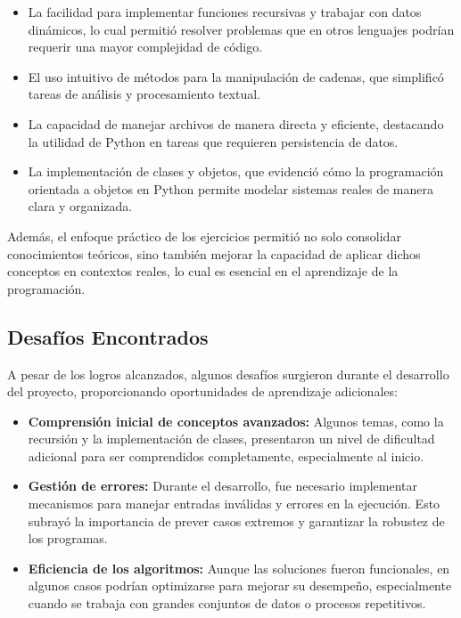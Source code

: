 \documentclass[conference]{IEEEtran}
\begin{document}
\begin{itemize}
    \item La facilidad para implementar funciones recursivas y trabajar con datos dinámicos, lo cual permitió resolver problemas que en otros lenguajes podrían requerir una mayor complejidad de código.
    \item El uso intuitivo de métodos para la manipulación de cadenas, que simplificó tareas de análisis y procesamiento textual.
    \item La capacidad de manejar archivos de manera directa y eficiente, destacando la utilidad de Python en tareas que requieren persistencia de datos.
    \item La implementación de clases y objetos, que evidenció cómo la programación orientada a objetos en Python permite modelar sistemas reales de manera clara y organizada.
\end{itemize}

Además, el enfoque práctico de los ejercicios permitió no solo consolidar conocimientos teóricos, sino también mejorar la capacidad de aplicar dichos conceptos en contextos reales, lo cual es esencial en el aprendizaje de la programación.

\subsection{Desafíos Encontrados}
A pesar de los logros alcanzados, algunos desafíos surgieron durante el desarrollo del proyecto, proporcionando oportunidades de aprendizaje adicionales:

\begin{itemize}
    \item \textbf{Comprensión inicial de conceptos avanzados:} Algunos temas, como la recursión y la implementación de clases, presentaron un nivel de dificultad adicional para ser comprendidos completamente, especialmente al inicio.
    \item \textbf{Gestión de errores:} Durante el desarrollo, fue necesario implementar mecanismos para manejar entradas inválidas y errores en la ejecución. Esto subrayó la importancia de prever casos extremos y garantizar la robustez de los programas.
    \item \textbf{Eficiencia de los algoritmos:} Aunque las soluciones fueron funcionales, en algunos casos podrían optimizarse para mejorar su desempeño, especialmente cuando se trabaja con grandes conjuntos de datos o procesos repetitivos.
\end{itemize}
\end{document}
